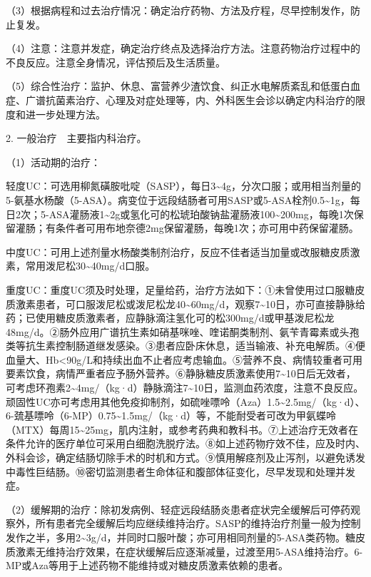 （3）根据病程和过去治疗情况：确定治疗药物、方法及疗程，尽早控制发作，防止复发。

（4）注意：注意并发症，确定治疗终点及选择治疗方法。注意药物治疗过程中的不良反应。注意全身情况，评估预后及生活质量。

（5）综合性治疗：监护、休息、富营养少渣饮食、纠正水电解质紊乱和低蛋白血症、广谱抗菌素治疗、心理及对症处理等，内、外科医生会诊以确定内科治疗的限度和进一步处理方法。

2. 一般治疗　主要指内科治疗。

（1）活动期的治疗：

轻度UC：可选用柳氮磺胺吡啶（SASP），每日3\textasciitilde{}4g，分次口服；或用相当剂量的5-氨基水杨酸（5-ASA）。病变位于远段结肠者可用SASP或5-ASA栓剂0.5\textasciitilde{}1g，每日2次；5-ASA灌肠液1\textasciitilde{}2g或氢化可的松琥珀酸钠盐灌肠液100\textasciitilde{}200mg，每晚1次保留灌肠；有条件者可用布地奈德2mg保留灌肠，每晚1次；亦可用中药保留灌肠。

中度UC：可用上述剂量水杨酸类制剂治疗，反应不佳者适当加量或改服糖皮质激素，常用泼尼松30\textasciitilde{}40mg/d口服。

重度UC：重度UC须及时处理，足量给药，治疗方法如下：①未曾使用过口服糖皮质激素患者，可口服泼尼松或泼尼松龙40\textasciitilde{}60mg/d，观察7\textasciitilde{}10日，亦可直接静脉给药；已使用糖皮质激素者，应静脉滴注氢化可的松300mg/d或甲基泼尼松龙48mg/d。②肠外应用广谱抗生素如硝基咪唑、喹诺酮类制剂、氨苄青霉素或头孢类等抗生素控制肠道继发感染。③患者应卧床休息，适当输液、补充电解质。④便血量大、Hb\textless{}90g/L和持续出血不止者应考虑输血。⑤营养不良、病情较重者可用要素饮食，病情严重者应予肠外营养。⑥静脉糖皮质激素使用7\textasciitilde{}10日后无效者，可考虑环孢素2\textasciitilde{}4mg/（kg·d）静脉滴注7\textasciitilde{}10日，监测血药浓度，注意不良反应。顽固性UC亦可考虑用其他免疫抑制剂，如硫唑嘌呤（Aza）1.5\textasciitilde{}2.5mg/（kg·d）、6-巯基嘌呤（6-MP）0.75\textasciitilde{}1.5mg/（kg·d）等，不能耐受者可改为甲氨蝶呤（MTX）每周15\textasciitilde{}25mg，肌内注射，或参考药典和教科书。⑦上述治疗无效者在条件允许的医疗单位可采用白细胞洗脱疗法。⑧如上述药物疗效不佳，应及时内、外科会诊，确定结肠切除手术的时机和方式。⑨慎用解痉剂及止泻剂，以避免诱发中毒性巨结肠。⑩密切监测患者生命体征和腹部体征变化，尽早发现和处理并发症。

（2）缓解期的治疗：除初发病例、轻症远段结肠炎患者症状完全缓解后可停药观察外，所有患者完全缓解后均应继续维持治疗。SASP的维持治疗剂量一般为控制发作之半，多用2\textasciitilde{}3g/d，并同时口服叶酸；亦可用相同剂量的5-ASA类药物。糖皮质激素无维持治疗效果，在症状缓解后应逐渐减量，过渡至用5-ASA维持治疗。6-MP或Aza等用于上述药物不能维持或对糖皮质激素依赖的患者。

